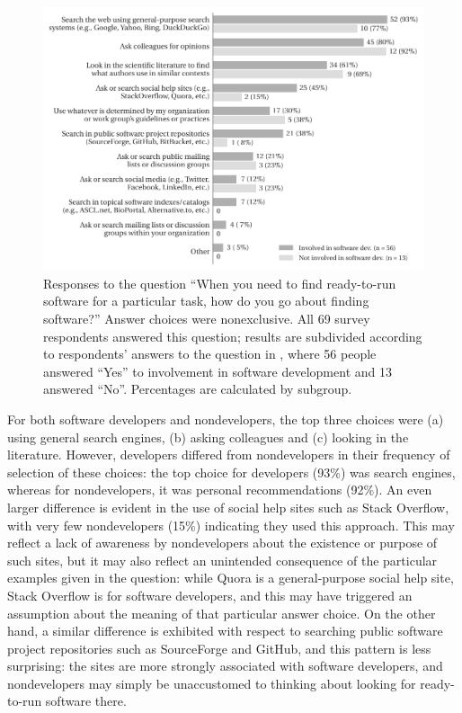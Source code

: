 \documentclass{casicswhitepaper}
\begin{document}
\begin{figure}[htb]
  \vspace*{-1ex}
  \centering
  \includegraphics{files/plots/how-find-ready-to-run-v4.pdf}
  \vspace*{-4ex}
  \caption{Responses to the question ``When you need to find ready-to-run software for a particular task, how do you go about finding software?'' Answer choices were nonexclusive.  All 69 survey respondents answered this question; results are subdivided according to respondents' answers to the question in , where 56 people answered ``Yes'' to involvement in software development and 13 answered ``No''.  Percentages are calculated by subgroup.}
  \label{how-find-ready-to-run}
\end{figure}

For both software developers and nondevelopers, the top three choices were (a) using general search engines, (b) asking colleagues and (c) looking in the literature.  However, developers differed from nondevelopers in their frequency of selection of these choices: the top choice for developers (93\%) was search engines, whereas for nondevelopers, it was personal recommendations (92\%).  An even larger difference is evident in the use of social help sites such as Stack Overflow, with very few nondevelopers (15\%) indicating they used this approach.  This may reflect a lack of awareness by nondevelopers about the existence or purpose of such sites, but it may also reflect an unintended consequence of the particular examples given in the question: while Quora is a general-purpose social help site, Stack Overflow is for software developers, and this may have triggered an assumption about the meaning of that particular answer choice.  On the other hand, a similar difference is exhibited with respect to searching public software project repositories such as SourceForge and GitHub, and this pattern is less surprising: the sites are more strongly associated with software developers, and nondevelopers may simply be unaccustomed to thinking about looking for ready-to-run software there.
\end{document}
